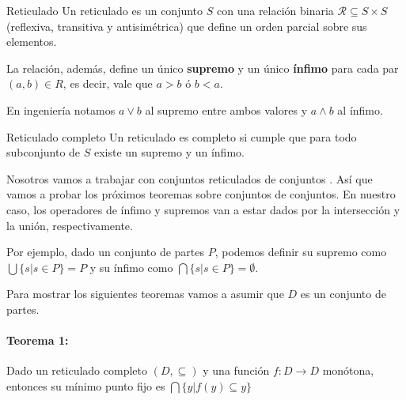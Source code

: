 \begin{definicion}{Reticulado}
Un reticulado es un conjunto $S$ con una relación binaria $\mathcal{R}\subseteq S\times S$ (reflexiva, transitiva y antisimétrica) que define un orden parcial sobre sus elementos.

La relación, además, define un único \textbf{supremo} y un único \textbf{ínfimo} para cada par $(a,b)\in R$, es decir, vale que $a > b$ ó $b < a$.

En ingeniería notamos $a\lor b$ al supremo entre ambos valores y $a \land b$ al ínfimo.
\end{definicion}

\begin{definicion}{Reticulado completo}
Un reticulado es completo si cumple que para todo subconjunto de $S$ existe un supremo y un ínfimo.
\end{definicion}

Nosotros vamos a trabajar con conjuntos reticulados de conjuntos . Así que vamos a probar los próximos teoremas sobre conjuntos de conjuntos. En nuestro caso, los operadores de ínfimo y supremos van a estar dados por la intersección y la unión, respectivamente.

Por ejemplo, dado un conjunto de partes $P$, podemos definir su supremo como $ \bigcup\{ s | s \in P\} = P$ y su ínfimo como $\bigcap\{s | s \in P\} = \emptyset$.

Para mostrar los siguientes teoremas vamos a asumir que $D$ es un conjunto de partes.
\paragraph{Teorema 1:} Dado un reticulado completo $(D, \subseteq)$ y una función $f:D\to D$ monótona, entonces su mínimo punto fijo es $\bigcap\{ y | f(y) \subseteq y\}$


